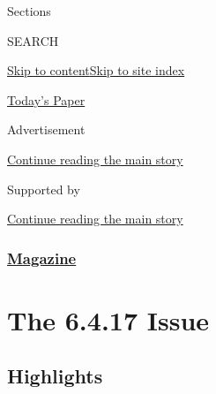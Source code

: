 Sections

SEARCH

\protect\hyperlink{site-content}{Skip to
content}\protect\hyperlink{site-index}{Skip to site index}

\href{https://myaccount.nytimes3xbfgragh.onion/auth/login?response_type=cookie\&client_id=vi}{}

\href{https://www.nytimes3xbfgragh.onion/section/todayspaper}{Today's
Paper}

Advertisement

\protect\hyperlink{after-top}{Continue reading the main story}

Supported by

\protect\hyperlink{after-sponsor}{Continue reading the main story}

\hypertarget{magazine}{%
\subsubsection{\texorpdfstring{\href{/section/magazine}{Magazine}}{Magazine}}\label{magazine}}

\hypertarget{the-6417-issue}{%
\section{The 6.4.17 Issue}\label{the-6417-issue}}

\hypertarget{highlights}{%
\subsection{Highlights}\label{highlights}}

